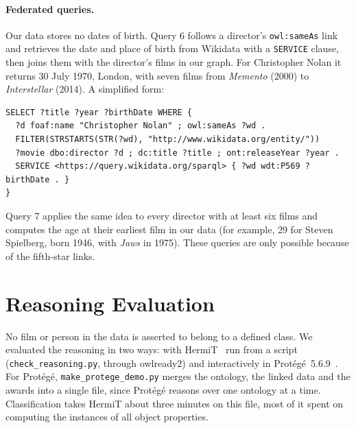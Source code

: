 \documentclass[11pt,a4paper]{article}
\newcommand{\code}[1]{\texttt{#1}}
\begin{document}
\paragraph{Federated queries.} Our data stores no dates of birth. Query 6 follows a director's \code{owl:sameAs} link and retrieves the date and place of birth from Wikidata with a \code{SERVICE} clause, then joins them with the director's films in our graph. For Christopher Nolan it returns 30 July 1970, London, with seven films from \emph{Memento} (2000) to \emph{Interstellar} (2014). A simplified form:
\par\noindent\begin{minipage}{\linewidth}\begin{lstlisting}[language=sparql]
SELECT ?title ?year ?birthDate WHERE {
  ?d foaf:name "Christopher Nolan" ; owl:sameAs ?wd .
  FILTER(STRSTARTS(STR(?wd), "http://www.wikidata.org/entity/"))
  ?movie dbo:director ?d ; dc:title ?title ; ont:releaseYear ?year .
  SERVICE <https://query.wikidata.org/sparql> { ?wd wdt:P569 ?birthDate . }
}
\end{lstlisting}\end{minipage}\par
Query 7 applies the same idea to every director with at least six films and computes the age at their earliest film in our data (for example, 29 for Steven Spielberg, born 1946, with \emph{Jaws} in 1975). These queries are only possible because of the fifth-star links.

\section{Reasoning Evaluation}\label{sec:reasoning}

No film or person in the data is asserted to belong to a defined class. We evaluated the reasoning in two ways: with HermiT~\cite{hermit} run from a script (\code{check\_reasoning.py}, through owlready2) and interactively in Protégé~5.6.9~\cite{protege}. For Protégé, \code{make\_protege\_demo.py} merges the ontology, the linked data and the awards into a single file, since Protégé reasons over one ontology at a time. Classification takes HermiT about three minutes on this file, most of it spent on computing the instances of all object properties.
\end{document}
